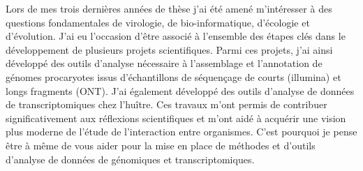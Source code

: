 \documentclass[11pt, a4paper]{awesome-cv}
\begin{document}
\begin{cvletter}
Lors de mes trois dernières années de thèse j’ai été amené m’intéresser à des questions fondamentales de virologie, de bio-informatique, d'écologie et d'évolution. J’ai eu l’occasion d’être associé à l'ensemble des étapes clés dans le développement de plusieurs projets scientifiques. Parmi ces projets, j’ai ainsi développé des outils d’analyse nécessaire à l’assemblage et l’annotation de génomes procaryotes issus d’échantillons de séquençage de courts (illumina) et longs fragments (ONT). J’ai également développé des outils d’analyse de données de transcriptomiques chez l'huître. Ces travaux m’ont permis de contribuer significativement aux réflexions scientifiques et m’ont aidé à acquérir  une vision plus moderne de l’étude de l’interaction entre organismes. C'est pourquoi je pense être à même de vous aider pour la mise en place de méthodes et d’outils d'analyse de données de génomiques et transcriptomiques.

\end{cvletter}


\makeletterclosing
\end{document}

